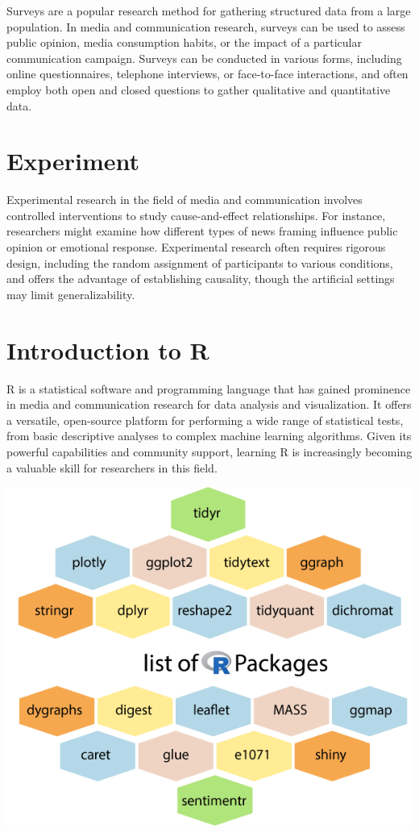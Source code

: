 \documentclass[
  b5paper]{book}
\begin{document}
Surveys are a popular research method for gathering structured data from a large population. In media and communication research, surveys can be used to assess public opinion, media consumption habits, or the impact of a particular communication campaign. Surveys can be conducted in various forms, including online questionnaires, telephone interviews, or face-to-face interactions, and often employ both open and closed questions to gather qualitative and quantitative data.

\hypertarget{experiment}{%
\section*{Experiment}\label{experiment}}

Experimental research in the field of media and communication involves controlled interventions to study cause-and-effect relationships. For instance, researchers might examine how different types of news framing influence public opinion or emotional response. Experimental research often requires rigorous design, including the random assignment of participants to various conditions, and offers the advantage of establishing causality, though the artificial settings may limit generalizability.

\hypertarget{introduction-to-r}{%
\section*{Introduction to R}\label{introduction-to-r}}

R is a statistical software and programming language that has gained prominence in media and communication research for data analysis and visualization. It offers a versatile, open-source platform for performing a wide range of statistical tests, from basic descriptive analyses to complex machine learning algorithms. Given its powerful capabilities and community support, learning R is increasingly becoming a valuable skill for researchers in this field.

\includegraphics[width=1\textwidth,height=\textheight]{images/List-of-r-packages.png}
\end{document}
